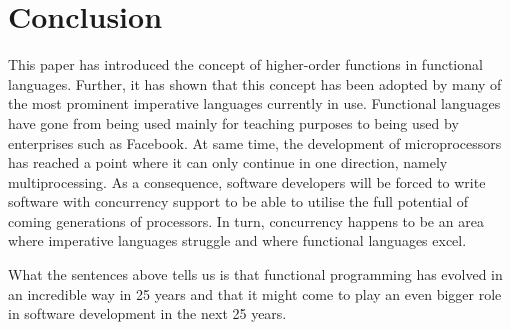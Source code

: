 \documentclass[conference]{IEEEtran}
\begin{document}




\section{Conclusion}

This paper has introduced the concept of higher-order functions in functional languages. Further, it has shown that this concept has been adopted by many of the most prominent imperative languages currently in use. Functional languages have gone from being used mainly for teaching purposes to being used by enterprises such as Facebook. At same time, the development of microprocessors has reached a point where it can only continue in one direction, namely multiprocessing. As a consequence, software developers will be forced to write software with concurrency support to be able to utilise the full potential of coming generations of processors. In turn, concurrency happens to be an area where imperative languages struggle and where functional languages excel.

What the sentences above tells us is that functional programming has evolved in an incredible way in 25 years and that it might come to play an even bigger role in software development in the next 25 years.







%
%
%
\end{document}
